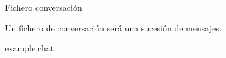 

\begin{frame}{Fichero conversación}
	\begin{block}{ }
		Un fichero de conversación será una sucesión de mensajes.
	\end{block}
	
	\begin{exampleblock}{example.chat}
		\begin{figure}[H]
		
		\end{figure}
	\end{exampleblock}
\end{frame}







